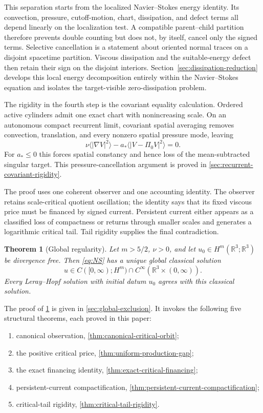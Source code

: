 \documentclass[11pt]{amsart}
\numberwithin{equation}{section}
\theoremstyle{plain}
\newtheorem{theorem}{Theorem}[section]
\theoremstyle{definition}
\theoremstyle{remark}
\newcommand{\R}{\mathbb R}
\begin{document}
This separation starts from the localized Navier--Stokes energy identity.
Its convection, pressure, cutoff-motion, chart, dissipation, and defect terms
all depend linearly on the localization test.  A compatible parent--child
partition therefore prevents double counting but does not, by itself, cancel
only the signed terms.  Selective cancellation is a statement about oriented
normal traces on a disjoint spacetime partition.  Viscous dissipation and the
suitable-energy defect then retain their sign on the disjoint interiors.
Section~\ref{sec:dissipation-reduction} develops this local energy decomposition entirely within
the Navier--Stokes equation and isolates the target-visible zero-dissipation
problem.

The rigidity in the fourth step is the covariant equality calculation.
Ordered active cylinders admit one exact chart with nonincreasing scale.  On
an autonomous compact recurrent limit, covariant spatial averaging removes
convection, translation, and every nonzero spatial pressure mode, leaving
\[
 \nu\langle|\nabla V|^2\rangle
 -a_*\langle|V-\Pi_0V|^2\rangle=0.
\]
For \(a_*\le0\) this forces spatial constancy and hence loss of the
mean-subtracted singular target.  This pressure-cancellation argument is
proved in \cref{sec:recurrent-covariant-rigidity}.

The proof uses one coherent observer and one accounting identity.  The
observer retains scale-critical quotient oscillation; the identity says that
its fixed viscous price must be financed by signed current.  Persistent current
either appears as a classified loss of compactness or returns through smaller
scales and generates a logarithmic critical tail.  Tail rigidity supplies the
final contradiction.

\begin{theorem}[Global regularity]
\label{thm:intro-main}
Let \(m>5/2\), \(\nu>0\), and let
\(u_0\in H^m(\R^3;\R^3)\) be divergence free.  Then \eqref{eq:NS} has a
unique global classical solution
\[
 u\in C([0,\infty);H^m)\cap C^\infty(\R^3\times(0,\infty)).
\]
Every Leray--Hopf solution with initial datum \(u_0\) agrees with this
classical solution.
\end{theorem}

The proof of \cref{thm:intro-main} is given in
\cref{sec:global-exclusion}.  It invokes the following five structural
theorems, each proved in this paper:
\begin{enumerate}[label=\textup{(\roman*)},leftmargin=2.2em]
\item canonical observation, \cref{thm:canonical-critical-orbit};
\item the positive critical price, \cref{thm:uniform-production-gap};
\item the exact financing identity,
\cref{thm:exact-critical-financing};
\item persistent-current compactification,
\cref{thm:persistent-current-compactification};
\item critical-tail rigidity, \cref{thm:critical-tail-rigidity}.
\end{enumerate}
\end{document}
